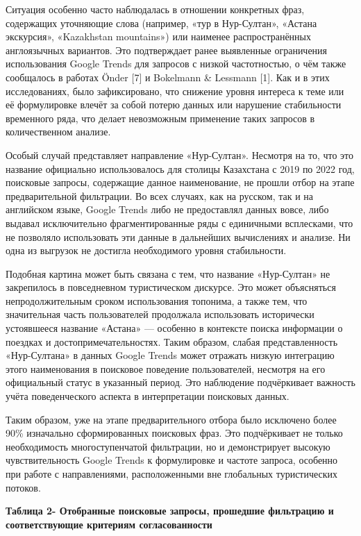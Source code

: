 Ситуация особенно часто наблюдалась в отношении конкретных фраз,
содержащих уточняющие слова (например, «тур в Нур-Султан», «Астана
экскурсия», «Kazakhstan mountains») или наименее распространённых
англоязычных вариантов. Это подтверждает ранее выявленные ограничения
использования Google Trends для запросов с низкой частотностью, о чём
также сообщалось в работах Önder {[}7{]} и Bokelmann \& Lessmann
{[}1{]}. Как и в этих исследованиях, было зафиксировано, что снижение
уровня интереса к теме или её формулировке влечёт за собой потерю данных
или нарушение стабильности временного ряда, что делает невозможным
применение таких запросов в количественном анализе.

Особый случай представляет направление «Нур-Султан». Несмотря на то, что
это название официально использовалось для столицы Казахстана с 2019 по
2022 год, поисковые запросы, содержащие данное наименование, не прошли
отбор на этапе предварительной фильтрации. Во всех случаях, как на
русском, так и на английском языке, Google Trends либо не предоставлял
данных вовсе, либо выдавал исключительно фрагментированные ряды с
единичными всплесками, что не позволяло использовать эти данные в
дальнейших вычислениях и анализе. Ни одна из выгрузок не достигла
необходимого уровня стабильности.

Подобная картина может быть связана с тем, что название «Нур-Султан» не
закрепилось в повседневном туристическом дискурсе. Это может объясняться
непродолжительным сроком использования топонима, а также тем, что
значительная часть пользователей продолжала использовать исторически
устоявшееся название «Астана» --- особенно в контексте поиска информации
о поездках и достопримечательностях. Таким образом, слабая
представленность «Нур-Султана» в данных Google Trends может отражать
низкую интеграцию этого наименования в поисковое поведение
пользователей, несмотря на его официальный статус в указанный период.
Это наблюдение подчёркивает важность учёта поведенческого аспекта в
интерпретации поисковых данных.

Таким образом, уже на этапе предварительного отбора было исключено более
90\% изначально сформированных поисковых фраз. Это подчёркивает не
только необходимость многоступенчатой фильтрации, но и демонстрирует
высокую чувствительность Google Trends к формулировке и частоте запроса,
особенно при работе с направлениями, расположенными вне глобальных
туристических потоков.

{\bfseries Таблица 2- Отобранные поисковые запросы, прошедшие фильтрацию и
соответствующие критериям согласованности}

